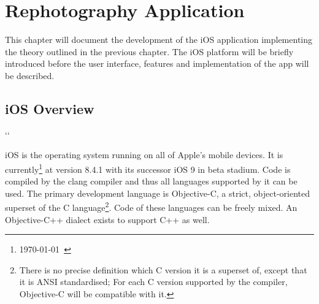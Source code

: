 \chapter{Rephotography Application}

This chapter will document the development of the iOS application implementing
the theory outlined in the previous chapter. The iOS platform will be briefly
introduced before the user interface, features and implementation of the app
will be described.

\section{iOS Overview}

\newcommand*{\code}[1]{\begingroup\ttfamily\hyphenchar\font=23{#1}\endgroup}
\lccode`\:`\:

\setlength{\fboxsep}{0pt}
\newcommand*{\colorcode}[1]{\colorbox{gray!50}{\code{#1}\hspace{-6pt}}} %

iOS is the operating system running on all of Apple's mobile devices. It is
currently\footnote{\today\ \citep{ios8}} at version 8.4.1 with its successor iOS
9 in beta stadium. Code is compiled by the clang compiler and thus all
languages supported by it can be used. The primary development
language is Objective-C, a strict, object-oriented superset of the C language\footnote{There is
   no precise definition which C version it is a superset of, except that it is
   ANSI standardised; For each C version supported by the compiler, Objective-C
will be compatible with it.}. Code of these languages can be freely mixed. An
Objective-C++ dialect exists to support C++ as well.

